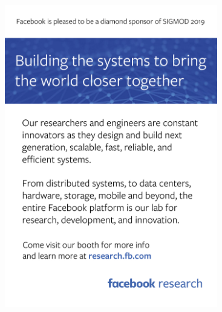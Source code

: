 
\clearpage


\ifthispageodd{\hbox{}\newpage}{}





\thispagestyle{empty}
\includegraphics[width=93mm]{ads/facebook.pdf}


